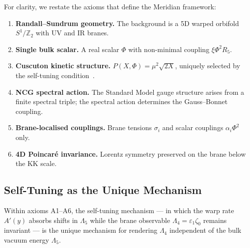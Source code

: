 For clarity, we restate the axioms that define the Meridian framework:

\begin{enumerate}
  \item[\textbf{(A1)}] \textbf{Randall--Sundrum geometry.} The background is a 5D warped orbifold $S^1/\mathbb{Z}_2$ with UV and IR branes.
  \item[\textbf{(A2)}] \textbf{Single bulk scalar.} A real scalar $\Phi$ with non-minimal coupling $\xi\Phi^2 R_5$.
  \item[\textbf{(A3)}] \textbf{Cuscuton kinetic structure.} $P(X,\Phi) = \mu^2\sqrt{2X}$, uniquely selected by the self-tuning condition~\cite{ch3:afshordi2007,ch3:derham2016}.
  \item[\textbf{(A4)}] \textbf{NCG spectral action.} The Standard Model gauge structure arises from a finite spectral triple; the spectral action determines the Gauss--Bonnet coupling.
  \item[\textbf{(A5)}] \textbf{Brane-localised couplings.} Brane tensions $\sigma_i$ and scalar couplings $\alpha_i \Phi^2$ only.
  \item[\textbf{(A6)}] \textbf{4D Poincar\'e invariance.} Lorentz symmetry preserved on the brane below the KK scale.
\end{enumerate}

\subsection{Self-Tuning as the Unique Mechanism}
\label{sec:3-vnogo-uniqueness}

\begin{proposition}
\label{thm:vnogo-unique}
Within axioms \textup{A1--A6}, the self-tuning mechanism --- in which the warp rate $A'(y)$ absorbs shifts in $\Lambda_5$ while the brane observable $\Lambda_4 = \varepsilon_1\zeta_0$ remains invariant --- is the unique mechanism for rendering $\Lambda_4$ independent of the bulk vacuum energy $\Lambda_5$.
\end{proposition}

